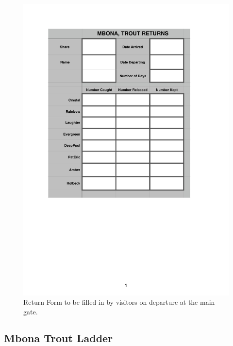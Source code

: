 \begin{appendices}
\begin{figure}[H]
\centering
  \includegraphics[scale=1]{tables/TablesTroutReturns.pdf}
   \caption{Return Form to be filled in by visitors on departure at the main gate.}
  \label{fig:TroutReturnForm}
\end{figure}


\subsection{Mbona Trout Ladder}


\end{appendices}
